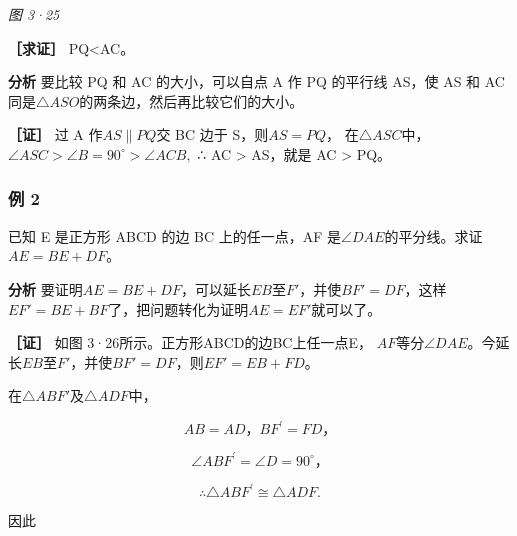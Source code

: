 \emph{图 3·25}

\textbf{［求证］} PQ\textless AC。

\textbf{分析} 要比较 PQ 和 AC 的大小，可以自点 A 作 PQ 的平行线 AS，使
AS 和 AC 同是\(\triangle ASO\)的两条边，然后再比较它们的大小。

\textbf{［证］} 过 A 作\(AS \parallel PQ\)交 BC 边于 S，则\(AS = PQ\)，
在\(\triangle ASC\)中，\(\angle ASC > \angle B = 90^\circ > \angle ACB,\)
∴ AC \textgreater{} AS，就是 AC \textgreater{} PQ。

\subsubsection{例 2}

已知 E 是正方形 ABCD 的边 BC 上的任一点，AF
是\(\angle DAE\)的平分线。求证\(AE = BE + DF\)。

\textbf{分析}
要证明\(AE = BE + DF\)，可以延长\(EB\)至\(F'\)，并使\(BF' = DF\)，这样\(EF' = BE + BF\)了，把问题转化为证明\(AE = EF'\)就可以了。

\textbf{［证］} 如图 3·26所示。正方形ABCD的边BC上任一点E，
\(AF\)等分\(\angle DAE\)。今延长\(EB\)至\(F'\)，并使\(BF' = DF\)，则\(EF' = EB + FD\)。

在\(\triangle ABF'\)及\(\triangle ADF\)中，

\[
AB = AD\text{，} BF ^{\prime} = FD\text{，}
\]

\[
\angle ABF ^{\prime} = \angle D = 90 ^{\circ}\text{，}
\]

\[
\therefore \triangle ABF ^{\prime} \cong \triangle ADF.
\]

因此


